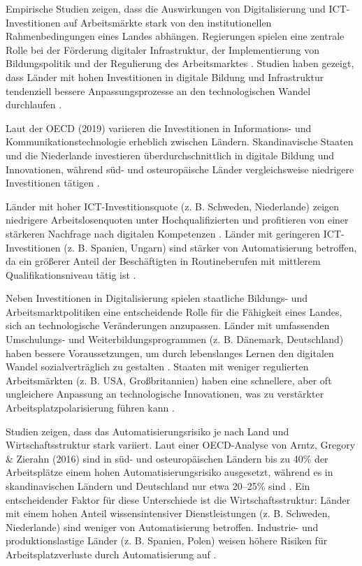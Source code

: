 Empirische Studien zeigen, dass die Auswirkungen von Digitalisierung und 
\ac{ICT}-Investitionen auf Arbeitsmärkte stark von den institutionellen Rahmenbedingungen 
eines Landes abhängen. Regierungen spielen eine zentrale Rolle bei der Förderung digitaler 
Infrastruktur, der Implementierung von Bildungspolitik und der Regulierung des 
Arbeitsmarktes \parencite[vgl.][S. 1–5]{hall2001varieties}. Studien haben gezeigt, dass 
Länder mit hohen Investitionen in digitale Bildung und Infrastruktur tendenziell bessere 
Anpassungsprozesse an den technologischen Wandel durchlaufen 
\parencite[vgl.][S. 23]{oecd2020digital}.

Laut der OECD (2019) variieren die Investitionen in Informations- und 
Kommunikationstechnologie erheblich zwischen Ländern. Skandinavische Staaten und die 
Niederlande investieren überdurchschnittlich in digitale Bildung und Innovationen, während 
süd- und osteuropäische Länder vergleichsweise niedrigere Investitionen tätigen 
\parencite[vgl.][S. 45]{oecd2020digital}.

Länder mit hoher ICT-Investitionsquote (z. B. Schweden, Niederlande) zeigen niedrigere 
Arbeitslosenquoten unter Hochqualifizierten und profitieren von einer stärkeren Nachfrage 
nach digitalen Kompetenzen \parencite[vgl.][S. 78]{brynjolfsson2014thesecond}.
Länder mit geringeren ICT-Investitionen (z. B. Spanien, Ungarn) sind stärker von 
Automatisierung betroffen, da ein größerer Anteil der Beschäftigten in Routineberufen mit 
mittlerem Qualifikationsniveau tätig ist \parencite[vgl.][S. 12]{frey2013thefuture}.

Neben Investitionen in Digitalisierung spielen staatliche Bildungs- und 
Arbeitsmarktpolitiken eine entscheidende Rolle für die Fähigkeit eines Landes, sich an 
technologische Veränderungen anzupassen. Länder mit umfassenden Umschulungs- und 
Weiterbildungsprogrammen (z. B. Dänemark, Deutschland) haben bessere Voraussetzungen, um 
durch lebenslanges Lernen den digitalen Wandel sozialverträglich zu gestalten 
\parencite[vgl.][S. 361]{vu2011ict}. Staaten mit weniger regulierten Arbeitsmärkten (z. B. 
USA, Großbritannien) haben eine schnellere, aber oft ungleichere Anpassung an 
technologische Innovationen, was zu verstärkter Arbeitsplatzpolarisierung führen kann 
\parencite[vgl.][S. 172]{goos2014explaining}.

Studien zeigen, dass das Automatisierungsrisiko je nach Land und Wirtschaftsstruktur stark 
variiert. Laut einer OECD-Analyse von Arntz, Gregory \& Zierahn (2016) sind in süd- und 
osteuropäischen Ländern bis zu 40\% der Arbeitsplätze einem hohen Automatisierungsrisiko 
ausgesetzt, während es in skandinavischen Ländern und Deutschland nur etwa 20–25\% sind 
\parencite[vgl.][S. 12]{arntz2016therisk}. Ein entscheidender Faktor für diese Unterschiede 
ist die Wirtschaftsstruktur: Länder mit einem hohen Anteil wissensintensiver Dienstleistungen 
(z. B. Schweden, Niederlande) sind weniger von Automatisierung betroffen. Industrie- und 
produktionslastige Länder (z. B. Spanien, Polen) weisen höhere Risiken für Arbeitsplatzverluste 
durch Automatisierung auf \parencite[vgl.][S. 260]{frey2013thefuture}.

